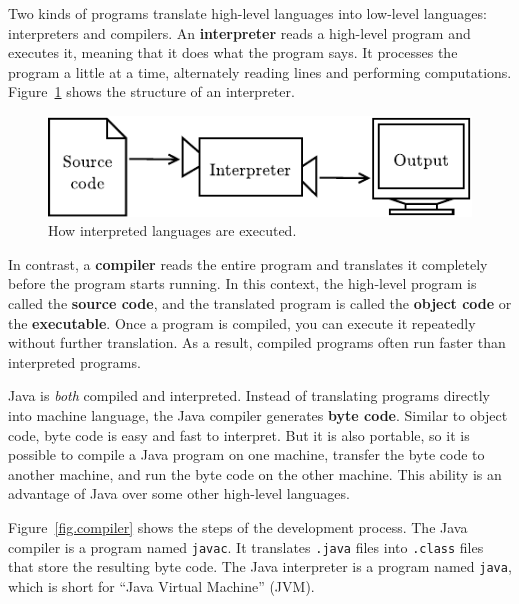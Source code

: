 
Two kinds of programs translate high-level languages into low-level languages: interpreters and compilers.
An {\bf interpreter} reads a high-level program and executes it, meaning that it does what the program says.
It processes the program a little at a time, alternately reading lines and performing computations.
Figure~\ref{fig.interpreter} shows the structure of an interpreter.

\begin{figure}[!ht]
\begin{center}
\includegraphics{figs/interpreter.pdf}
\caption{How interpreted languages are executed.}
\label{fig.interpreter}
\end{center}
\end{figure}


In contrast, a {\bf compiler} reads the entire program and translates it completely before the program starts running.
In this context, the high-level program is called the {\bf source code}, and the translated program is called the {\bf object code} or the {\bf executable}.
Once a program is compiled, you can execute it repeatedly without further translation.
As a result, compiled programs often run faster than interpreted programs.


Java is {\em both} compiled and interpreted.
Instead of translating programs directly into machine language, the Java compiler generates {\bf byte code}.
Similar to object code, byte code is easy and fast to interpret.
But it is also portable, so it is possible to compile a Java program on one machine, transfer the byte code to another machine, and run the byte code on the other machine.
This ability is an advantage of Java over some other high-level languages.


Figure~\ref{fig.compiler} shows the steps of the development process.
The Java compiler is a program named {\tt javac}.
It translates {\tt .java} files into {\tt .class} files that store the resulting byte code.
The Java interpreter is a program named {\tt java}, which is short for ``Java Virtual Machine'' (JVM).

